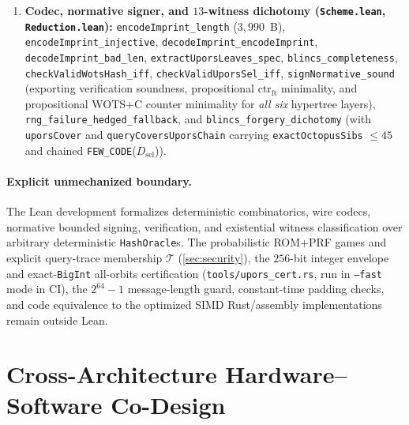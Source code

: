\documentclass[11pt,a4paper]{article}
\theoremstyle{definition}
\theoremstyle{remark}
\newcommand{\WOTSC}{\textsf{WOTS+C}}
\begin{document}
{\begin{enumerate}[leftmargin=1.4em,itemsep=2pt]
  \item \textbf{Codec, normative signer, and $13$-witness dichotomy (\texttt{Scheme.lean}, \texttt{Reduction.lean}):} \texttt{encodeImprint\_\allowbreak length} ($3{,}990$~B), \texttt{encodeImprint\_\allowbreak injective}, \texttt{decodeImprint\_\allowbreak encodeImprint}, \texttt{decodeImprint\_\allowbreak bad\_\allowbreak len}, \texttt{extractUporsLeaves\_\allowbreak spec}, \texttt{blincs\_\allowbreak completeness}, \texttt{checkValidWotsHash\_\allowbreak iff}, \texttt{checkValidUporsSel\_\allowbreak iff}, \texttt{signNormative\_\allowbreak sound} (exporting verification soundness, propositional $\mathrm{ctr}_{\mathrm{ft}}$ minimality, and propositional \WOTSC{} counter minimality for \emph{all six} hypertree layers), \texttt{rng\_\allowbreak failure\_\allowbreak hedged\_\allowbreak fallback}, and \texttt{blincs\_\allowbreak forgery\_\allowbreak dichotomy} (with \texttt{uporsCover} and \texttt{queryCoversUporsChain} carrying \texttt{exactOctopusSibs} $\le 45$ and chained \texttt{FEW\_CODE}($D_{\mathrm{sel}}$)).
\end{enumerate}
}

\paragraph{Explicit unmechanized boundary.}
The Lean development formalizes deterministic combinatorics, wire codecs, normative bounded signing, verification, and existential witness classification over arbitrary deterministic \texttt{HashOracle}s. The probabilistic ROM+PRF games and explicit query-trace membership $\mathcal{T}$ (\cref{sec:security}), the $256$-bit integer envelope and exact-\texttt{BigInt} all-orbits certification (\texttt{tools/upors\_cert.rs}, run in \texttt{--fast} mode in CI), the $2^{64}-1$ message-length guard, constant-time padding checks, and code equivalence to the optimized SIMD Rust/assembly implementations remain outside Lean.

\section{Cross-Architecture Hardware--Software Co-Design}
\label{sec:codesign}
\end{document}
